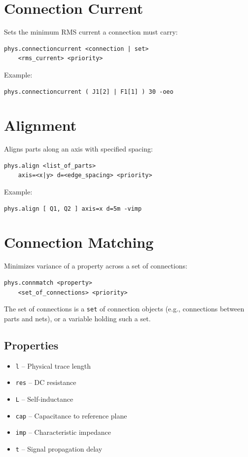\section{Connection Current}
Sets the minimum RMS current a connection must carry:
\begin{verbatim}
phys.connectioncurrent <connection | set> 
    <rms_current> <priority>
\end{verbatim}

Example:
\begin{verbatim}
phys.connectioncurrent ( J1[2] | F1[1] ) 30 -oeo
\end{verbatim}

\section{Alignment}
Aligns parts along an axis with specified spacing:
\begin{verbatim}
phys.align <list_of_parts> 
    axis=<x|y> d=<edge_spacing> <priority>
\end{verbatim}

Example:
\begin{verbatim}
phys.align [ Q1, Q2 ] axis=x d=5m -vimp
\end{verbatim}

\section{Connection Matching}
Minimizes variance of a property across a set of connections:
\begin{verbatim}
phys.connmatch <property> 
    <set_of_connections> <priority>
\end{verbatim}
The set of connections is a \texttt{set} of connection objects (e.g., connections between parts and nets), or a variable holding such a set.

\subsection{Properties}
\begin{itemize}
\item \texttt{l} -- Physical trace length
\item \texttt{res} -- DC resistance
\item \texttt{L} -- Self-inductance
\item \texttt{cap} -- Capacitance to reference plane
\item \texttt{imp} -- Characteristic impedance
\item \texttt{t} -- Signal propagation delay
\end{itemize}

